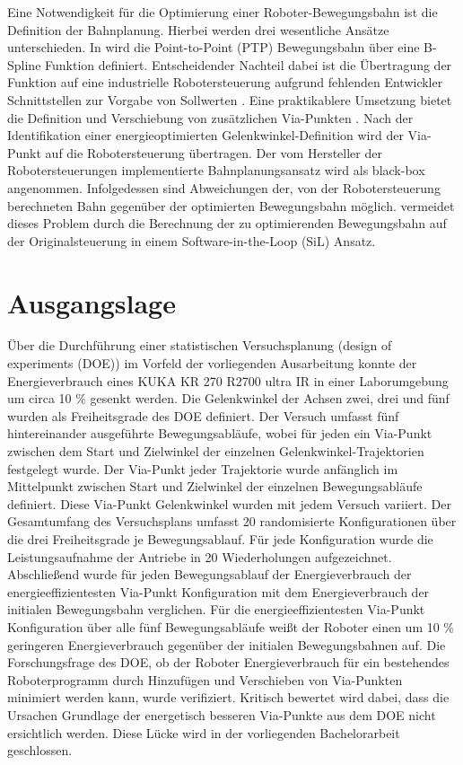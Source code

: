%
%
Eine Notwendigkeit für die Optimierung einer Roboter-Bewegungsbahn ist die Definition der Bahnplanung. Hierbei werden drei wesentliche Ansätze unterschieden. In \cite{Hansen.2012} wird die Point-to-Point (PTP) Bewegungsbahn über eine B-Spline Funktion definiert. Entscheidender Nachteil dabei ist die Übertragung der Funktion auf eine industrielle Robotersteuerung aufgrund fehlenden Entwickler Schnittstellen zur Vorgabe von Sollwerten \cite[S.~55~f.]{Eggers.2019}. Eine praktikablere Umsetzung bietet die Definition und Verschiebung von zusätzlichen Via-Punkten \cite[S.~261~ff.]{Spong.2020}. Nach der Identifikation einer energieoptimierten Gelenkwinkel-Definition wird der Via-Punkt auf die Robotersteuerung übertragen. Der vom Hersteller der Robotersteuerungen implementierte Bahnplanungsansatz wird als black-box angenommen. Infolgedessen sind Abweichungen der, von der Robotersteuerung berechneten Bahn gegenüber der optimierten Bewegungsbahn möglich. \cite{Eggers.2019} vermeidet dieses Problem durch die Berechnung der zu optimierenden Bewegungsbahn auf der Originalsteuerung in einem Software-in-the-Loop (SiL) Ansatz. 
%
\section{Ausgangslage}
Über die Durchführung einer statistischen Versuchsplanung (design of experiments (DOE)) im Vorfeld der vorliegenden Ausarbeitung konnte der Energieverbrauch eines KUKA KR 270 R2700 ultra IR in einer Laborumgebung um circa 10 \% gesenkt werden. Die Gelenkwinkel der Achsen zwei, drei und fünf wurden als Freiheitsgrade des DOE definiert. Der Versuch umfasst fünf hintereinander ausgeführte Bewegungsabläufe, wobei für jeden ein Via-Punkt zwischen dem Start und Zielwinkel der einzelnen Gelenkwinkel-Trajektorien festgelegt wurde. Der Via-Punkt jeder Trajektorie wurde anfänglich im Mittelpunkt zwischen Start und Zielwinkel der einzelnen Bewegungsabläufe definiert. Diese Via-Punkt Gelenkwinkel wurden mit jedem Versuch variiert. Der Gesamtumfang des Versuchsplans umfasst 20 randomisierte Konfigurationen über die drei Freiheitsgrade je Bewegungsablauf. Für jede Konfiguration wurde die Leistungsaufnahme der Antriebe in 20 Wiederholungen aufgezeichnet. Abschließend wurde für jeden Bewegungsablauf der Energieverbrauch der energieeffizientesten Via-Punkt Konfiguration mit dem Energieverbrauch der initialen Bewegungsbahn verglichen. Für die energieeffizientesten Via-Punkt Konfiguration über alle fünf Bewegungsabläufe weißt der Roboter  einen um 10 \% geringeren Energieverbrauch gegenüber der initialen Bewegungsbahnen auf. Die Forschungsfrage des DOE, ob der Roboter Energieverbrauch für ein bestehendes Roboterprogramm durch Hinzufügen und Verschieben von Via-Punkten minimiert werden kann, wurde verifiziert. Kritisch bewertet wird dabei, dass die Ursachen Grundlage der energetisch besseren Via-Punkte aus dem DOE nicht ersichtlich werden. Diese Lücke wird in der vorliegenden Bachelorarbeit geschlossen.
%
